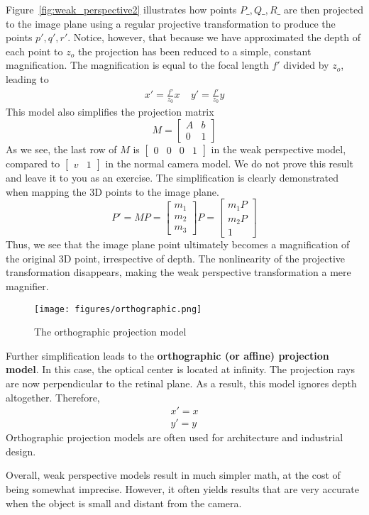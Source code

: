 \documentclass[a4paper, 12pt]{article}
\renewcommand\emph{\textbf}
\begin{document}
Figure~\ref{fig:weak_perspective2} illustrates how points $P\_, Q\_, R\_$ are then projected to the image plane using a regular projective transformation to produce the points $p', q', r'$. Notice, however, that because we have approximated the depth of each point to $z_o$ the projection has been reduced to a simple, constant magnification. The magnification is equal to the focal length $f'$ divided by $z_o$, leading to
\begin{align*}
x'=\frac{f'}{z_0}x\ \ \ \ \ 
y'=\frac{f'}{z_0}y
\end{align*}
This model also simplifies the projection matrix
\[M = \begin{bmatrix}
A & b \\ 0 & 1
\end{bmatrix}\]
As we see, the last row of $M$ is $\begin{bmatrix}
0 & 0& 0 &1
\end{bmatrix}$ in the weak perspective model, compared to $\begin{bmatrix}
v&1
\end{bmatrix}$ in the normal camera model. We do not prove this result and leave it to you as an exercise. The simplification is clearly demonstrated when mapping the 3D points to the image plane. 
\begin{equation}
    P' = MP = \begin{bmatrix}
    m_1 \\ m_2 \\ m_3
    \end{bmatrix}P = \begin{bmatrix}
    m_1P \\ m_2P \\ 1
    \end{bmatrix}
\end{equation}
Thus, we see that the image plane point ultimately becomes a magnification of the original 3D point, irrespective of depth. The nonlinearity of the projective transformation disappears, making the weak perspective transformation a mere magnifier.

\begin{figure}[h!]
\centering
\texttt{[image: figures/orthographic.png]}
\caption{The orthographic projection model}
\label{fig:orthographic}
\end{figure}


Further simplification leads to the \emph{orthographic (or affine) projection model}. In this case, the optical center is located at infinity. The projection rays are now perpendicular to the retinal plane. As a result, this model ignores depth altogether.  Therefore,
\begin{align*}
    x' = x\\
    y' = y
\end{align*}
Orthographic projection models are often used for architecture and industrial design.

Overall, weak perspective models result in much simpler math, at the cost of being somewhat imprecise. However, it often yields results that are very accurate when the object is small and distant from the camera. 
\end{document}
